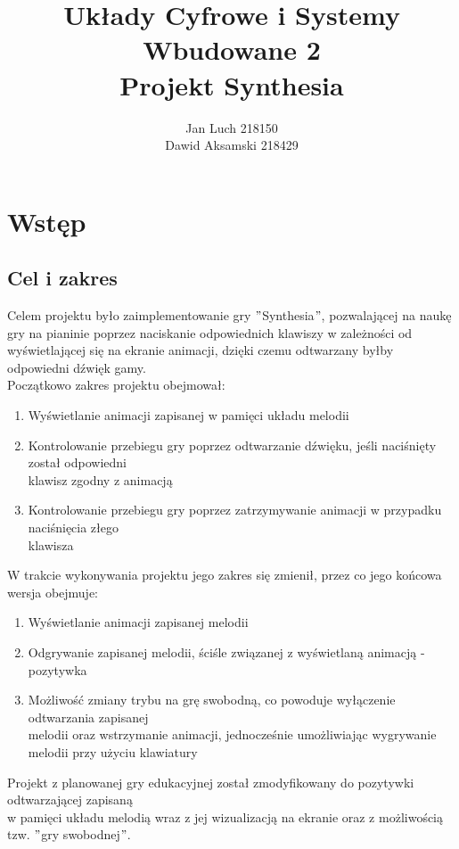 \documentclass[a4paper]{report}
\title{\huge Układy Cyfrowe i Systemy Wbudowane 2\\Projekt Synthesia}
\date{} %
\author{Jan Luch\hspace{42pt} 218150  \\Dawid Aksamski\hspace{5pt} 218429}
\begin{document}
\frenchspacing
{}
\maketitle
\newpage

\tableofcontents
\newpage


\chapter{Wstęp}
	\section{Cel i zakres}
	Celem projektu było zaimplementowanie gry $"$Synthesia$"$, pozwalającej na naukę gry na pianinie poprzez naciskanie odpowiednich klawiszy w zależności od wyświetlającej się na ekranie animacji, dzięki czemu odtwarzany byłby odpowiedni dźwięk gamy.\\
	
Początkowo zakres projektu obejmował:
	\begin{enumerate}
	\item Wyświetlanie animacji zapisanej w pamięci układu melodii
	\item Kontrolowanie przebiegu gry poprzez odtwarzanie dźwięku, jeśli naciśnięty został odpowiedni \\klawisz zgodny z animacją
	\item Kontrolowanie przebiegu gry poprzez zatrzymywanie animacji w przypadku naciśnięcia złego \\klawisza
	\end{enumerate}
	
W trakcie wykonywania projektu jego zakres się zmienił, przez co jego końcowa wersja obejmuje:
	\begin{enumerate}
	\item Wyświetlanie animacji zapisanej melodii
	\item Odgrywanie zapisanej  melodii, ściśle związanej z wyświetlaną animacją - pozytywka
	\item Możliwość zmiany trybu na grę swobodną, co powoduje wyłączenie odtwarzania zapisanej \\melodii oraz wstrzymanie animacji, jednocześnie umożliwiając wygrywanie melodii przy użyciu klawiatury
	\end{enumerate}
	
	Projekt z planowanej gry edukacyjnej został zmodyfikowany do pozytywki odtwarzającej zapisaną \\w pamięci układu melodią wraz z jej wizualizacją na ekranie oraz z możliwością tzw. $"$gry swobodnej$"$.
\end{document}
